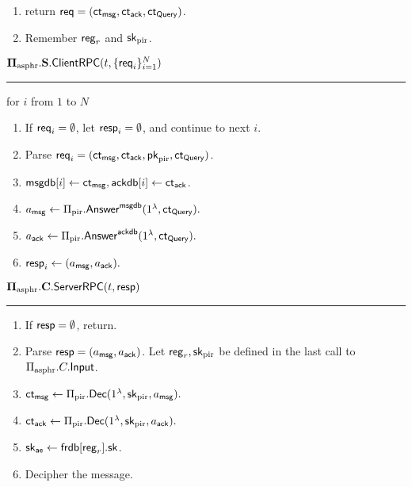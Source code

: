 \begin{definition}
\begin{enumerate}
\begin{itemize}
    \end{itemize}
    \item return $\mathsf{req} = (\mathsf{ct}_{\mathsf{msg}}, \mathsf{ct}_{\mathsf{ack}}, \mathsf{ct}_{\mathsf{Query}})$.
    \item Remember $\mathsf{reg}_r$ and ${\mathsf{sk}}_{\text{pir}}$.
\end{enumerate}
\vspace{10pt}
$\mathbf{\Pi_{\text{asphr}}.S.\mathsf{ClientRPC}}(t, \{\mathsf{req}_i\}_{i = 1}^N)$
\vspace{5pt}
\hrule
\vspace{5pt}
\item for $i$ from $1$ to $N$
\begin{enumerate}
    \item If $\mathsf{req}_i = \emptyset$, let $\mathsf{resp}_i = \emptyset$, and continue to next $i$. 
    \item Parse $\mathsf{req}_i = (\mathsf{ct}_{\mathsf{msg}}, \mathsf{ct}_{\mathsf{ack}}, \mathsf{pk}_{\text{pir}}, \mathsf{ct}_{\mathsf{Query}})$.
    \item $\mathsf{msgdb}[i] \leftarrow \mathsf{ct}_{\mathsf{msg}}, \mathsf{ackdb}[i] \leftarrow \mathsf{ct}_{\mathsf{ack}}$.
    \item $a_{\mathsf{msg}} \leftarrow \Pi_{\text{pir}}.\mathsf{Answer}^{\mathsf{msgdb}}(1^{\lambda}, \mathsf{ct}_{\mathsf{Query}}).$
    \item $a_{\mathsf{ack}} \leftarrow \Pi_{\text{pir}}.\mathsf{Answer}^{\mathsf{ackdb}}(1^{\lambda}, \mathsf{ct}_{\mathsf{Query}}).$
    \item $\mathsf{resp}_i \leftarrow (a_{\mathsf{msg}}, a_{\mathsf{ack}}).$
\end{enumerate}
\vspace{10pt}
$\mathbf{\Pi_{\text{asphr}}.C.\mathsf{ServerRPC}}(t, \mathsf{resp})$
\vspace{5pt}
\hrule
\vspace{5pt}
\begin{enumerate}
    \item If $\mathsf{resp} = \emptyset$, return.
    \item Parse $\mathsf{resp} = (a_{\mathsf{msg}}, a_{\mathsf{ack}})$. Let $\mathsf{reg}_r, {\mathsf{sk}}_{\text{pir}}$ be defined in the last call to $\Pi_{\text{asphr}}.C.\mathsf{Input}$.
    \item $\mathsf{ct}_{\mathsf{msg}} \leftarrow \Pi_{\text{pir}}.\mathsf{Dec}(1^{\lambda}, {\mathsf{sk}}_{\text{pir}}, a_{\mathsf{msg}}).$
    \item $\mathsf{ct}_{\mathsf{ack}} \leftarrow \Pi_{\text{pir}}.\mathsf{Dec}(1^{\lambda}, {\mathsf{sk}}_{\text{pir}}, a_{\mathsf{ack}}).$
    \item ${\mathsf{sk}}_{\mathsf{ae}} \leftarrow \mathsf{frdb}[\mathsf{reg}_r].{\mathsf{sk}}$.
    \item Decipher the message.

\end{enumerate}
\end{definition}
